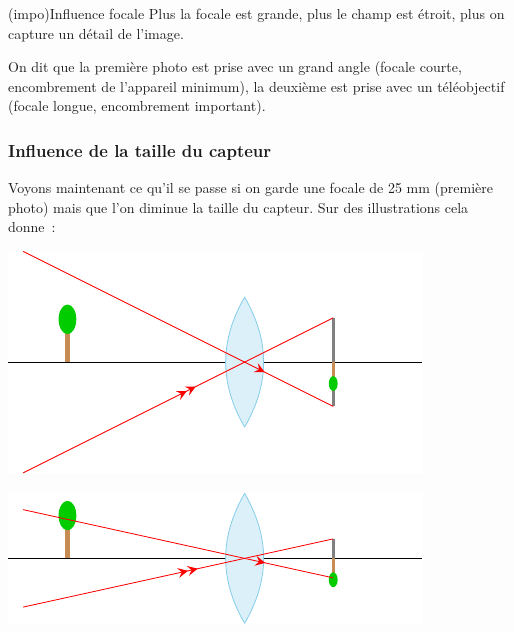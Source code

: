 \documentclass[../../main/main.tex]{subfiles}
\begin{document}
\begin{tcb}(impo){Influence focale}
	Plus la focale est grande, plus le champ est étroit, plus on capture un détail
	de l'image.
\end{tcb}

On dit que la première photo est prise avec un grand angle (focale courte,
encombrement de l'appareil minimum), la deuxième est prise avec un téléobjectif
(focale longue, encombrement important).

\subsubsection{Influence de la taille du capteur}

Voyons maintenant ce qu'il se passe si on garde une focale de 25 mm (première
photo) mais que l'on diminue la taille du capteur. Sur des illustrations cela
donne~:

\begin{minipage}{0.49\linewidth}
	\begin{center}
		\includegraphics[scale=1]{taille_capt-a} \\
	\end{center}
\end{minipage}
\begin{minipage}{0.49\linewidth}
	\begin{center}
		\includegraphics[scale=1]{taille_capt-b} \\
	\end{center}
\end{minipage}
\end{document}
